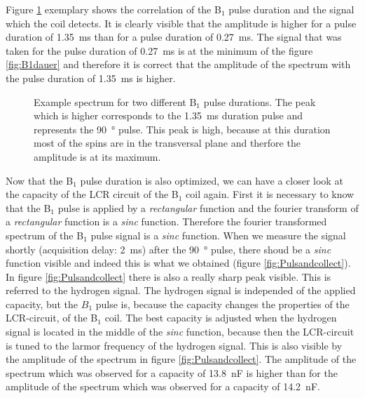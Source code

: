 Figure \ref{fig:pulsedurationbeispiel} exemplary shows the correlation of the B$_1$ pulse duration and the signal which the coil detects.
It is clearly visible that the amplitude is higher for a pulse duration of \SI{1.35}{\milli \second} than for a pulse duration of \SI{0.27}{\milli \second}.
The signal that was taken for the pulse duration of \SI{0.27}{\milli \second} is at the minimum of the figure \ref{fig:B1dauer} and therefore it is correct that the amplitude of the spectrum with the pulse duration of \SI{1.35}{\milli \second} is higher.
\begin{figure}[H]
    \centering
    
    \caption[Example spectrum for two different B$_1$ pulse durations.]{Example spectrum for two different B$_1$ pulse durations.
    The peak which is higher corresponds to the \SI{1.35}{\milli \second} duration pulse and represents the \SI{90}{\degree} pulse.
    This peak is high, because at this duration most of the spins are in the transversal plane and therfore the amplitude is at its maximum.}
    \label{fig:pulsedurationbeispiel}
\end{figure}
Now that the B$_1$ pulse duration is also optimized, we can have a closer look at the capacity of the LCR circuit of the B$_1$ coil again.
First it is necessary to know that the B$_1$ pulse is applied by a \textit{rectangular} function and the fourier transform of a \textit{rectangular} function is a \textit{sinc} function.
Therefore the fourier transformed spectrum of the B$_1$ pulse signal is a \textit{sinc} function.
When we measure the signal shortly (acquisition delay: \SI{2}{\milli \second}) after the \SI{90}{\degree} pulse, there shoud be a \textit{sinc} function visible and indeed this is what we obtained (figure \ref{fig:Pulsandcollect}).
In figure \ref{fig:Pulsandcollect} there is also a really sharp peak visible.
This is referred to the hydrogen signal.
The hydrogen signal is independed of the applied capacity, but the $B_1$ pulse is, because the capacity changes the properties of the LCR-circuit, of the B$_1$ coil.
The best capacity is adjusted when the hydrogen signal is located in the middle of the \textit{sinc} function, because then the LCR-circuit is tuned to the larmor frequency of the hydrogen signal.
This is also visible by the amplitude of the spectrum in figure \ref{fig:Pulsandcollect}.
The amplitude of the spectrum which was observed for a capacity of \SI{13.8}{\nano \farad} is higher than for the amplitude of the spectrum which was observed for a capacity of \SI{14.2}{\nano \farad}.

